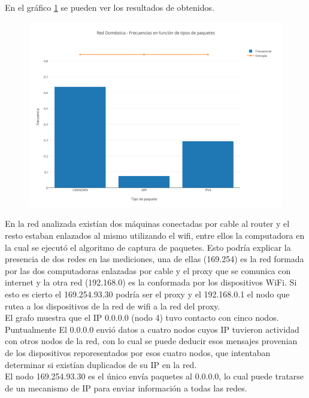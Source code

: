 En el gr\'afico \ref{domesticaPaquetes} se pueden ver los resultados de obtenidos.

\begin{figure}[h!]
    \centering                                                       
    \includegraphics[width=400pt]{img/DomesticaFrecuenciaVsTipoPaquetes}
    \caption{}
    \label{domesticaPaquetes}
\end{figure}


En la red analizada exist\'ian dos m\'aquinas conectadas por cable al router y el resto estaban enlazados al mismo utilizando el wifi, entre ellos la computadora en la cual se ejecut\'o el algoritmo de captura de paquetes. Esto podr\'ia explicar la presencia de dos redes en las mediciones, una de ellas (169.254) es la red formada por las dos computadoras enlazadas por cable y el proxy que se comunica con internet y la otra red (192.168.0) es la conformada por los dispositivos WiFi. Si esto es cierto el 169.254.93.30 podr\'ia ser el proxy y el 192.168.0.1 el nodo que rutea a los dispositivos de la red de wifi a la red del proxy.\\
El grafo muestra que el IP 0.0.0.0 (nodo 4) tuvo contacto con cinco nodos. Puntualmente El 0.0.0.0 envi\'o datos a cuatro nodos cuyos IP tuvieron actividad con otros nodos de la red, con lo cual se puede deducir esos mensajes provenian de los dispositivos reporesentados por esos cuatro nodos, que intentaban determinar si exist\'ian duplicados de su IP en la red. \\
El nodo 169.254.93.30 es el \'unico env\'ia paquetes al 0.0.0.0, lo cual puede tratarse de un mecanismo de IP para enviar informaci\'on a todas las redes.\\
